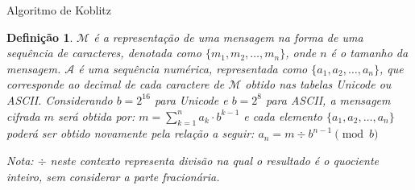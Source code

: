 \documentclass[brazil]{beamer}
\newtheorem{definicao}{Definição}\theoremstyle{definition}
\begin{document}
\begin{frame}{Algoritmo de Koblitz }
\begin{definicao}\label{definicao:6c615379-1811-4204-9b1c-fbe2862d9d14}
	$\mathcal{M}$ é a representação de uma mensagem na forma de uma sequência de caracteres, denotada como $\{m_1, m_2, \ldots, m_n\}$, onde $n$ é o tamanho da mensagem. $\mathcal{A} $ é uma sequência numérica, representada como $\{a_1, a_2, \ldots, a_n\}$, que corresponde ao decimal de cada caractere de $\mathcal{M}$ obtido nas tabelas  Unicode ou ASCII. Considerando $b = 2^{16}$ para Unicode e $b = 2^8$ para ASCII, a mensagem cifrada $m$ será obtida por: $m= \sum_{k=1}^{n} a_k \cdot b^{k-1}$ e cada elemento $\{a_1, a_2, \ldots, a_n\}$ poderá ser obtido novamente pela relação a seguir: $a_n = m \div b^{n-1}   \pmod{b}$

	\textit{Nota:  $\div $ neste contexto representa divisão na qual o resultado é o quociente inteiro, sem considerar a parte fracionária. }
\end{definicao}
\end{frame}
\end{document}
